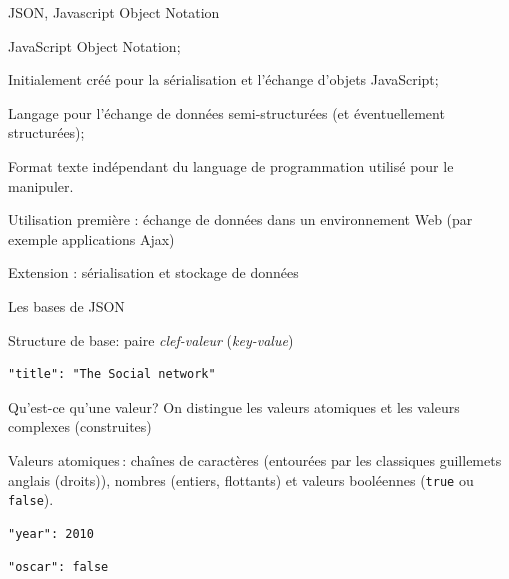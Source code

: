 \begin{frame}{JSON, Javascript Object Notation}

\begin{redbullet}
\item JavaScript Object Notation;
\item Initialement créé pour la sérialisation et l'échange d'objets JavaScript;
\item Langage pour l'échange de données semi-structurées (et éventuellement structurées);
\item Format texte indépendant du language de programmation utilisé pour le manipuler.
\end{redbullet}

\vfill 

Utilisation première : échange de données dans un environnement Web (par exemple applications Ajax)\\

\vfill

Extension : sérialisation
 et stockage de données 

\end{frame}



\begin{frame}{Les bases de JSON}

Structure de base: paire  \textit{clef-valeur} (\textit{key-value})


\begin{verbatim}
"title": "The Social network"
\end{verbatim}

\bigskip

\alert{Qu'est-ce qu'une valeur?} On distingue les
 valeurs \alert{atomiques} et les valeurs \alert{complexes} (construites)

\medskip
Valeurs atomiques\,: cha\^ines de caractères (entourées 
par les classiques guillemets anglais (droits)), nombres (entiers, flottants) 
et valeurs booléennes (\texttt{true} ou \texttt{false}).

\begin{verbatim}
"year": 2010
\end{verbatim}


\begin{verbatim}
"oscar": false
\end{verbatim}


\end{frame}

